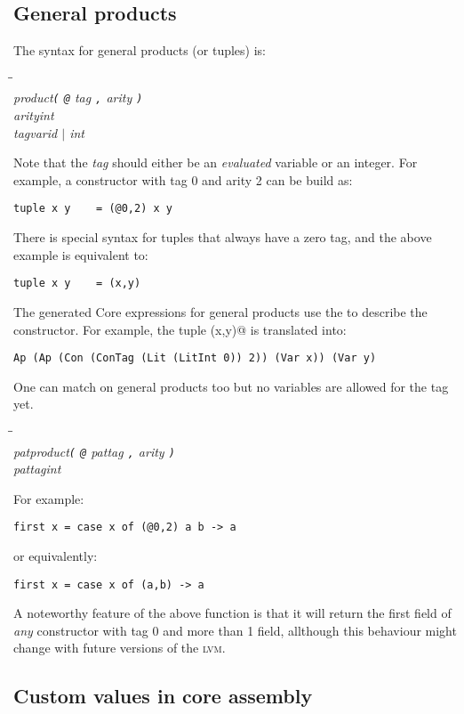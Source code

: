 \documentclass[a4paper,dvips]{article}
\newcommand{\lvm}{\textsc{lvm}}
\newenvironment{productions}%
  {\begin{tabbing}\hspace{2cm}\=\hspace{6cm}\=\kill{}\\}%
  {\end{tabbing}}
\newcommand{\fixed}[1]{\makebox[3.5em]{#1}}
\newcommand{\production}[3]{\nont{#1}\>\fixed{$\rightarrow$}\nont{#2}\>#3\\}
\newcommand{\nont}[1]{\textit{#1}}
\newcommand{\term}[1]{{\tt #1}}
\newcommand{\por}{$|$}
\begin{document}
\subsection{General products}

The syntax for general products (or tuples) is:
\begin{productions}
\production{product}{\term{(} \term{@} tag \term{,} arity \term{)}}{}
\production{arity}{\nont{int}}{}
\production{tag}{\nont{varid} \por{} \nont{int}}{}
\end{productions}

Note that the \nont{tag} should either be an \emph{evaluated} variable or an integer.
For example, a constructor with tag 0 and arity 2 can be build as:
\begin{verbatim}
tuple x y    = (@0,2) x y
\end{verbatim}

There is special syntax for tuples that always have a zero tag, and the above
example is equivalent to:
\begin{verbatim}
tuple x y    = (x,y)
\end{verbatim}

The generated Core expressions for general products use the \verb@ConTag@ 
to describe the constructor. For example, the tuple \verb@(x,y)@ is
translated into:
\begin{verbatim}
Ap (Ap (Con (ConTag (Lit (LitInt 0)) 2)) (Var x)) (Var y)
\end{verbatim}

One can match on general products too but no variables are allowed for
the tag yet.
\begin{productions}
\production{patproduct}{\term{(} \term{@} pattag \term{,} arity \term{)}}{}
\production{pattag}{\nont{int}}{}
\end{productions}

For example:
\begin{verbatim}
first x = case x of (@0,2) a b -> a
\end{verbatim}

or equivalently:
\begin{verbatim}
first x = case x of (a,b) -> a
\end{verbatim}

A noteworthy feature of the above function is that it will return the
first field of \emph{any} constructor with tag 0 and more than 1 field,
allthough this behaviour might change with future versions of the \lvm{}.

\subsection{Custom values in core assembly}
\end{document}
